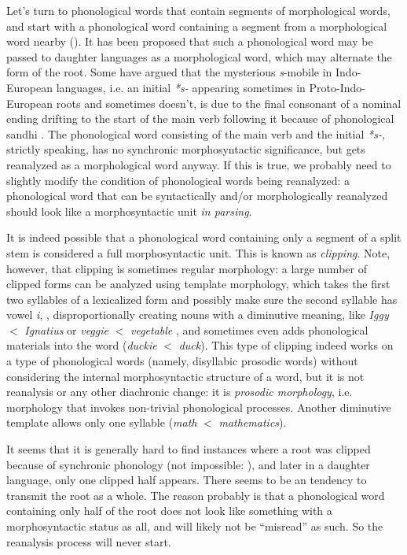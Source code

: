 \documentclass[a4paper, oneside, scheme=plain, 12pt]{article}
\newcommand*{\citepage}[1]{p.~{#1}}
\newcommand*{\term}[1]{\emph{#1}}
\newcommand{\form}[1]{\emph{#1}}
\newcommand*{\textlt}{$<$ }
\begin{document}
Let's turn to phonological words that contain segments of morphological words,
and start with a phonological word containing a segment from a morphological word nearby
().
It has been proposed that such a phonological word
may be passed to daughter languages as a morphological word,
which may alternate the form of the root.
Some have argued that the mysterious \form{s}-mobile in Indo-European languages,
i.e. an initial \form{*s-} appearing sometimes in Proto-Indo-European roots and sometimes doesn't,
is due to the final consonant of a nominal ending drifting to the start of the main verb following it
because of phonological sandhi \citep[\citepage{169}]{sihler1995new}.
The phonological word consisting of the main verb and the initial \form{*s-},
strictly speaking, has no synchronic morphosyntactic significance,
but gets reanalyzed as a morphological word anyway.
If this is true, we probably need to slightly modify the condition of phonological words being reanalyzed:
a phonological word that can be syntactically and/or morphologically reanalyzed
should look like a morphosyntactic unit \emph{in parsing}.

It is indeed possible that a phonological word containing only
a segment of a split stem is considered a full morphosyntactic unit.
This is known as \term{clipping}.
Note, however, that clipping is sometimes regular morphology:
a large number of clipped forms can be analyzed using template morphology,
which takes the first two syllables of a lexicalized form
and possibly make sure the second syllable has vowel \form{i},
\citep{bat2019templatic},
disproportionally creating nouns with a diminutive meaning,
like \form{Iggy} \textlt \form{Ignatius} or \form{veggie} \textlt \form{vegetable}
\citep{jamet2009morphophonological},
and sometimes even adds phonological materials into the word
(\form{duckie} \textlt \form{duck}).
This type of clipping indeed works on a type of phonological words
(namely, disyllabic prosodic words)
without considering the internal morphosyntactic structure of a word,
but it is not reanalysis or any other diachronic change:
it is \emph{prosodic morphology},
i.e. morphology that invokes non-trivial phonological processes. 
Another diminutive template allows only one syllable (\form{math} \textlt \form{mathematics}).

It seems that it is generally hard to find instances where a root was clipped because of synchronic phonology
(not impossible: ),
and later in a daughter language, only one clipped half appears.
There seems to be an tendency to transmit the root as a whole.
The reason probably is that a phonological word containing only half of the root
does not look like something with a morphosyntactic status as all,
and will likely not be ``misread'' as such.
So the reanalysis process will never start.
\end{document}
